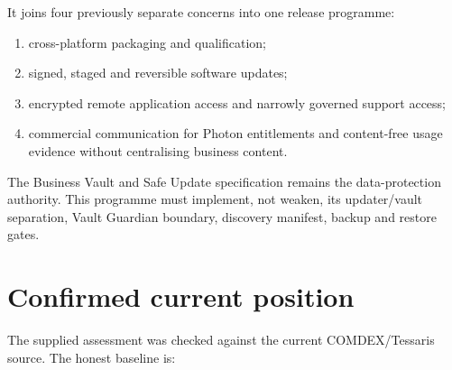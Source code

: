 \documentclass[11pt]{article}
\begin{document}
It joins four previously separate concerns into one release programme:

\begin{enumerate}
  \item cross-platform packaging and qualification;
  \item signed, staged and reversible software updates;
  \item encrypted remote application access and narrowly governed support access;
  \item commercial communication for Photon entitlements and content-free usage evidence without centralising business content.
\end{enumerate}

The Business Vault and Safe Update specification remains the data-protection authority. This programme must implement, not weaken, its updater/vault separation, Vault Guardian boundary, discovery manifest, backup and restore gates.

\section{Confirmed current position}

The supplied assessment was checked against the current COMDEX/Tessaris source. The honest baseline is:
\end{document}
